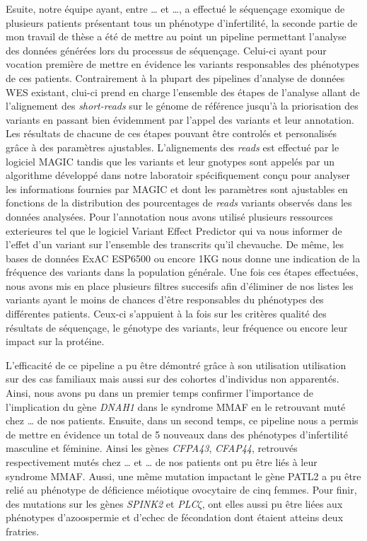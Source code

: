 \documentclass[12pt,twoside]{reedthesis}
\begin{document}
  Esuite, notre équipe ayant, entre \ldots{} et \ldots{}, a effectué le
  séquençage exomique de plusieurs patients présentant tous un phénotype
  d'infertilité, la seconde partie de mon travail de thèse a été de mettre
  au point un pipeline permettant l'analyse des données générées lors du
  processus de séquençage. Celui-ci ayant pour vocation première de mettre
  en évidence les variants responsables des phénotypes de ces patients.
  Contrairement à la plupart des pipelines d'analyse de données WES
  existant, clui-ci prend en charge l'ensemble des étapes de l'analyse
  allant de l'alignement des \emph{short-reads} sur le génome de référence
  jusqu'à la priorisation des variants en passant bien évidemment par
  l'appel des variants et leur annotation. Les résultats de chacune de ces
  étapes pouvant être controlés et personalisés grâce à des paramètres
  ajustables. L'alignements des \emph{reads} est effectué par le logiciel
  MAGIC tandis que les variants et leur gnotypes sont appelés par un
  algorithme développé dans notre laboratoir spécifiquement conçu pour
  analyser les informations fournies par MAGIC et dont les paramètres sont
  ajustables en fonctions de la distribution des pourcentages de
  \emph{reads} variants observés dans les données analysées. Pour
  l'annotation nous avons utilisé plusieurs ressources exterieures tel que
  le logiciel Variant Effect Predictor qui va nous informer de l'effet
  d'un variant sur l'ensemble des transcrits qu'il chevauche. De même, les
  bases de données ExAC ESP6500 ou encore 1KG nous donne une indication de
  la fréquence des variants dans la population générale. Une fois ces
  étapes effectuées, nous avons mis en place plusieurs filtres succesifs
  afin d'éliminer de nos listes les variants ayant le moins de chances
  d'être responsables du phénotypes des différentes patients. Ceux-ci
  s'appuient à la fois sur les critères qualité des résultats de
  séquençage, le génotype des variants, leur fréquence ou encore leur
  impact sur la protéine.
  
  L'efficacité de ce pipeline a pu être démontré grâce à son utilisation
  utilisation sur des cas familiaux mais aussi sur des cohortes
  d'individus non apparentés. Ainsi, nous avons pu dans un premier temps
  confirmer l'importance de l'implication du gène \emph{DNAH1} dans le
  syndrome MMAF en le retrouvant muté chez \ldots{} de nos patients.
  Ensuite, dans un second temps, ce pipeline nous a permis de mettre en
  évidence un total de 5 nouveaux dans des phénotypes d'infertilité
  masculine et féminine. Ainsi les gènes \emph{CFPA43}, \emph{CFAP44},
  retrouvés respectivement mutés chez \ldots{} et \ldots{} de nos patients
  ont pu être liés à leur syndrome MMAF. Aussi, une même mutation
  impactant le gène PATL2 a pu être relié au phénotype de déficience
  méiotique ovocytaire de cinq femmes. Pour finir, des mutations sur les
  gènes \emph{SPINK2} et \emph{PLC}\(\zeta\), ont elles aussi pu être
  liées aux phénotypes d'azoospermie et d'echec de fécondation dont
  étaient atteins deux fratries.
  
\end{document}

